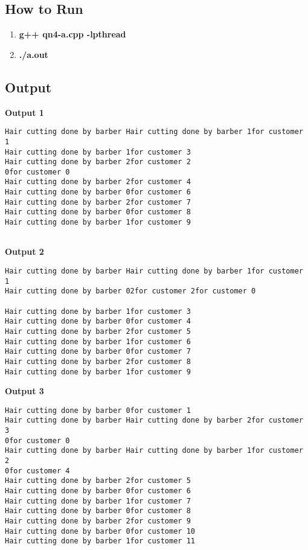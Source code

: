 \documentclass{article}
\begin{document}
    \subsection{How to Run}
    \begin{enumerate}
          \item \textbf{g++ qn4-a.cpp -lpthread}
        \item \textbf{./a.out}
    \end{enumerate}
      
    \subsection{Output}
            \textbf{Output 1}
            \begin{verbatim}
Hair cutting done by barber Hair cutting done by barber 1for customer 1
Hair cutting done by barber 1for customer 3
Hair cutting done by barber 2for customer 2
0for customer 0
Hair cutting done by barber 2for customer 4
Hair cutting done by barber 0for customer 6
Hair cutting done by barber 2for customer 7
Hair cutting done by barber 0for customer 8
Hair cutting done by barber 1for customer 9


\end{verbatim}
\textbf{Output 2}
\begin{verbatim}
Hair cutting done by barber Hair cutting done by barber 1for customer 1
Hair cutting done by barber 02for customer 2for customer 0

Hair cutting done by barber 1for customer 3
Hair cutting done by barber 0for customer 4
Hair cutting done by barber 2for customer 5
Hair cutting done by barber 1for customer 6
Hair cutting done by barber 0for customer 7
Hair cutting done by barber 2for customer 8
Hair cutting done by barber 1for customer 9

\end{verbatim}
\textbf{Output 3}
\begin{verbatim}
Hair cutting done by barber 0for customer 1
Hair cutting done by barber Hair cutting done by barber 2for customer 3
0for customer 0
Hair cutting done by barber Hair cutting done by barber 1for customer 2
0for customer 4
Hair cutting done by barber 2for customer 5
Hair cutting done by barber 0for customer 6
Hair cutting done by barber 1for customer 7
Hair cutting done by barber 0for customer 8
Hair cutting done by barber 2for customer 9
Hair cutting done by barber 0for customer 10
Hair cutting done by barber 1for customer 11
\end{verbatim}
      
\end{document}
